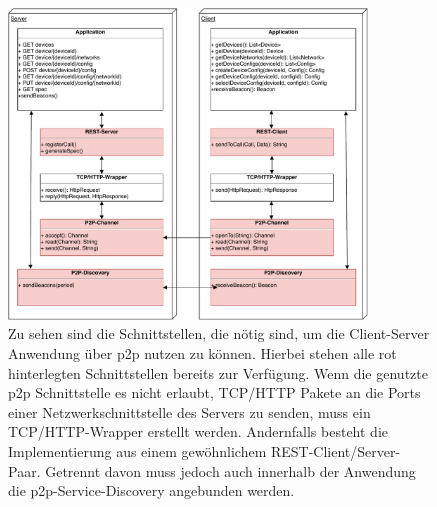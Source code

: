     \begin{leveldown}
    
    
    \pagebreak
    
    
	\begin{figure}[ht]
		\centering
	    \includegraphics[width=0.85\textwidth]{../latex-ai-project/IOT-Connectivity-Protocol-Stack}
    	\caption[]{Zu sehen sind die Schnittstellen, die nötig sind, um die Client-Server Anwendung über p2p nutzen zu können. Hierbei stehen alle rot hinterlegten Schnittstellen bereits zur Verfügung. Wenn die genutzte p2p Schnittstelle es nicht erlaubt, TCP/HTTP Pakete an die Ports einer Netzwerkschnittstelle des Servers zu senden, muss ein TCP/HTTP-Wrapper erstellt werden. Andernfalls besteht die Implementierung aus einem gewöhnlichem REST-Client/Server-Paar. Getrennt davon muss jedoch auch innerhalb der Anwendung die p2p-Service-Discovery angebunden werden. }
	    \label{protocol_stack}
	\end{figure}     
    
    
    

\end{leveldown}
